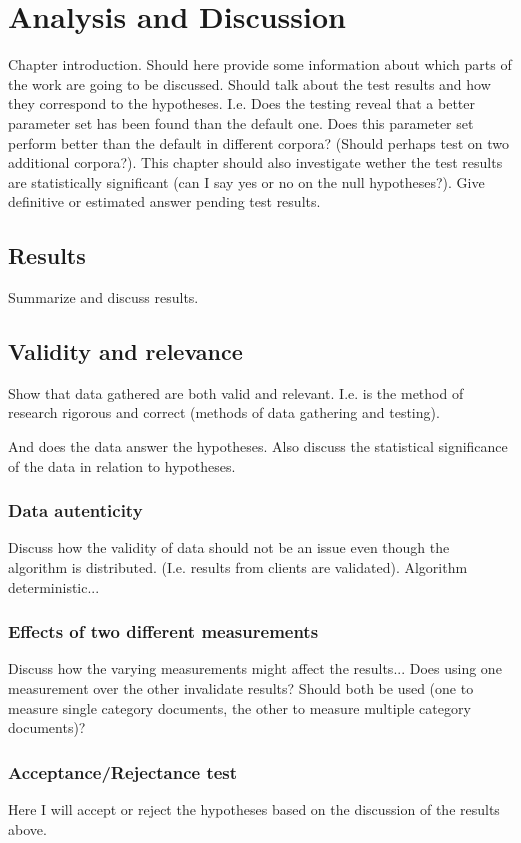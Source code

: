 
\chapter{Analysis and Discussion} %

\label{AnalysisAndDiscussion}


Chapter introduction. Should here provide some information about which parts of the work are going to be discussed.
Should talk about the test results and how they correspond to the hypotheses. I.e. Does the testing reveal that a
better parameter set has been found than the default one. Does this parameter set perform better than the default
in different corpora? (Should perhaps test on two additional corpora?). This chapter should also investigate wether
the test results are statistically significant (can I say yes or no on the null hypotheses?). Give definitive or
estimated answer pending test results.

\section{Results}
\label{Results}
Summarize and discuss results.

\section{Validity and relevance}
\label{ValidityRelevance}
Show that data gathered are both valid and relevant. I.e. is the method of research rigorous and correct (methods of data gathering and testing).

And does the data answer the hypotheses. Also discuss the statistical significance of the data in relation to hypotheses.

\subsection{Data autenticity}
Discuss how the validity of data should not be an issue even though the algorithm is distributed. (I.e. results from clients are validated).
Algorithm deterministic...

\subsection{Effects of two different measurements}
Discuss how the varying measurements might affect the results... Does using one measurement over the
other invalidate results? Should both be used (one to measure single category documents, the other to 
measure multiple category documents)?


\subsection{Acceptance/Rejectance test}
Here I will accept or reject the hypotheses based on the discussion of the results above.